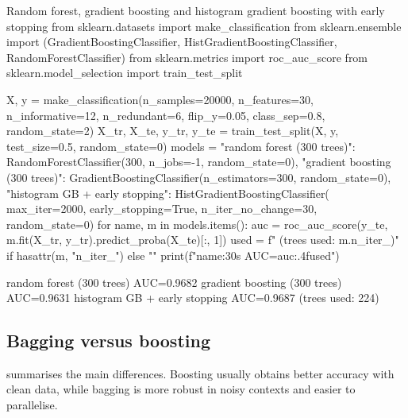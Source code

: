 \begin{pylisting}[label={lst:gb}]{Random forest, gradient boosting and histogram gradient boosting with early stopping}
from sklearn.datasets import make_classification
from sklearn.ensemble import (GradientBoostingClassifier, HistGradientBoostingClassifier,
                              RandomForestClassifier)
from sklearn.metrics import roc_auc_score
from sklearn.model_selection import train_test_split

X, y = make_classification(n_samples=20000, n_features=30, n_informative=12, n_redundant=6,
                           flip_y=0.05, class_sep=0.8, random_state=2)
X_tr, X_te, y_tr, y_te = train_test_split(X, y, test_size=0.5, random_state=0)
models = {
    "random forest (300 trees)": RandomForestClassifier(300, n_jobs=-1, random_state=0),
    "gradient boosting (300 trees)": GradientBoostingClassifier(n_estimators=300,
                                                                random_state=0),
    "histogram GB + early stopping": HistGradientBoostingClassifier(
        max_iter=2000, early_stopping=True, n_iter_no_change=30, random_state=0)}
for name, m in models.items():
    auc = roc_auc_score(y_te, m.fit(X_tr, y_tr).predict_proba(X_te)[:, 1])
    used = f"   (trees used: {m.n_iter_})" if hasattr(m, "n_iter_") else ""
    print(f"{name:30s} AUC={auc:.4f}{used}")
\end{pylisting}
\begin{pyoutput}
random forest (300 trees)      AUC=0.9682
gradient boosting (300 trees)  AUC=0.9631
histogram GB + early stopping  AUC=0.9687   (trees used: 224)
\end{pyoutput}

\subsection{Bagging versus boosting}

 summarises the main differences. Boosting usually obtains better accuracy
with clean data, while bagging is more robust in noisy contexts and easier to parallelise.

